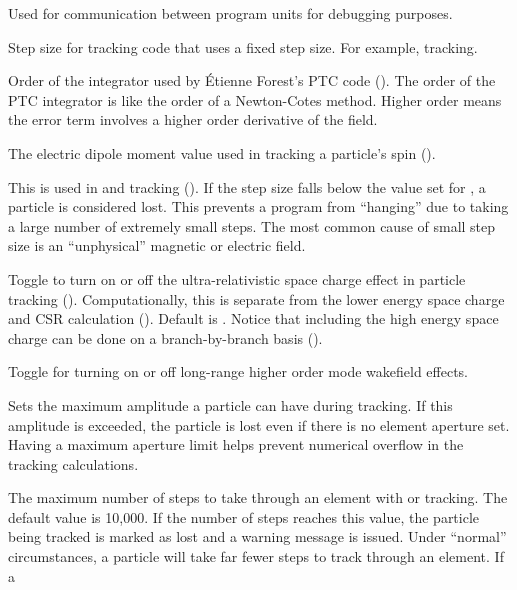 {\begin{description}
Used for communication between program units for debugging purposes.
%
\item[\vn{default_ds_step}] \Newline
Step size for tracking code  that uses a fixed step
size. For example,  tracking.
%
\item[\vn{default_integ_order}] \Newline
Order of the integrator used by \'Etienne Forest's PTC code ().
The order of the PTC integrator is like the order of a Newton-Cotes method.
Higher order means the error term involves a higher order derivative of the field.
%
\item[\vn{electric_dipole_moment}] \Newline
The electric dipole moment value used in tracking a particle's spin ().
%
\item[\vn{fatal_ds_adaptive_tracking}] \Newline
This is used in  and  tracking
().  If the step size falls below the value set for
, a particle is considered lost.
This prevents a program from ``hanging'' due to taking a large number
of extremely small steps. The most common cause of small step size is
an ``unphysical'' magnetic or electric field.
%
\item[\vn{high_energy_space_charge_on}] \Newline
Toggle to turn on or off the ultra-relativistic space charge effect in particle tracking
(). Computationally, this is separate from the lower energy space charge and
CSR calculation (). Default is . Notice that including the high energy space
charge can be done on a branch-by-branch basis ().
%
\item[\vn{lr_wakes_on}] \Newline
Toggle for turning on or off long-range higher order mode wakefield effects.
%
\item[\vn{max_aperture_limit}] \Newline 
Sets the maximum amplitude a particle can have during tracking. If this amplitude is exceeded, the
particle is lost even if there is no element aperture set. Having a maximum aperture limit helps
prevent numerical overflow in the tracking calculations.
%
\item[\vn{max_num_runge_kutta_step}] \Newline 
The maximum number of steps to take through an element with  or
 tracking. The default value is 10,000. If the number of steps reaches this
value, the particle being tracked is marked as lost and a warning message is issued. Under
``normal'' circumstances, a particle will take far fewer steps to track through an element. If a

\end{description}}
